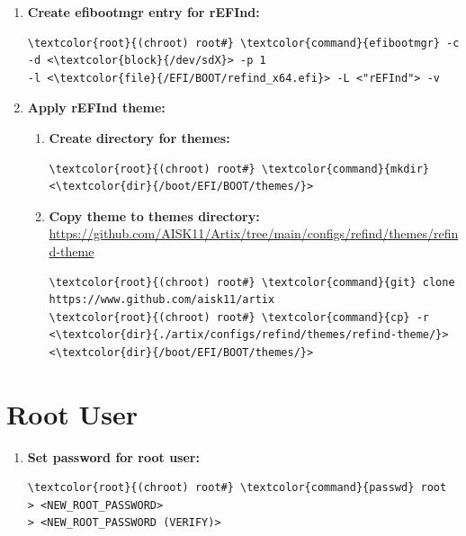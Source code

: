 \documentclass[10pt, a4paper, onecolumn, oneside, titlepage, openany]{book}
\begin{document}
\begin{enumerate}
\begin{Verbatim}[commandchars=\\\{\}]
menuentry "Artix" \{
    #volume  "ESP"
    icon    /EFI/BOOT/themes/refind-theme/icons/128-48/os_artix.png
    loader  /EFI/artix/vmlinuz-linux
    options "initrd=/EFI/artix/intel-ucode.img \char92
    initrd=/EFI/artix/initramfs-linux.img rw root=/dev/mapper/luks-root quiet"
    submenuentry "Debug" \{
        options "initrd=/EFI/artix/intel-ucode.img \char92
        initrd=/EFI/artix/initramfs-linux.img rw root=/dev/mapper/luks-root \char92
        rd.debug"
    \}
    #disabled
\}
\end{Verbatim}
    \item \textbf{Create efibootmgr entry for rEFInd:}
\begin{Verbatim}[commandchars=\\\{\}]
\textcolor{root}{(chroot) root#} \textcolor{command}{efibootmgr} -c -d <\textcolor{block}{/dev/sdX}> -p 1
-l <\textcolor{file}{/EFI/BOOT/refind_x64.efi}> -L <"rEFInd"> -v
\end{Verbatim}
    \item \textbf{Apply rEFInd theme:}
    \begin{enumerate}
        \item \textbf{Create directory for themes:}
\begin{Verbatim}[commandchars=\\\{\}]
\textcolor{root}{(chroot) root#} \textcolor{command}{mkdir} <\textcolor{dir}{/boot/EFI/BOOT/themes/}>
\end{Verbatim}
        \item \textbf{Copy theme to themes directory:}
\newline \url{https://github.com/AISK11/Artix/tree/main/configs/refind/themes/refind-theme}
\begin{Verbatim}[commandchars=\\\{\}]
\textcolor{root}{(chroot) root#} \textcolor{command}{git} clone https://www.github.com/aisk11/artix
\textcolor{root}{(chroot) root#} \textcolor{command}{cp} -r <\textcolor{dir}{./artix/configs/refind/themes/refind-theme/}>
<\textcolor{dir}{/boot/EFI/BOOT/themes/}>
\end{Verbatim}
    \end{enumerate}
\end{enumerate}


\section{Root User}
\begin{enumerate}
    \item \textbf{Set password for root user:}
\begin{Verbatim}[commandchars=\\\{\}]
\textcolor{root}{(chroot) root#} \textcolor{command}{passwd} root
> <NEW_ROOT_PASSWORD>
> <NEW_ROOT_PASSWORD (VERIFY)>
\end{Verbatim}
\end{enumerate}
\end{document}
